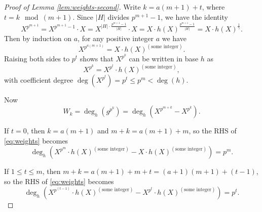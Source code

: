 \documentclass[10pt,a4paper]{amsart}
\begin{document}
\begin{proof}[Proof of Lemma \ref{lem:weights-second}] Write $k=a(m+1)+t$, where $t=k\mod (m+1).$ 
Since $|H|$ divides $p^{m+1}-1$, we have the identity
\[
X^{p^{m+1}} = X^{p^{m+1}-1}\cdot X = X^{|H|\cdot \frac{p^{m+1}-1}{|H|}}\cdot X
= X\cdot h(X)^{\frac{p^{m+1}-1}{|H|}}
= X\cdot h(X)^{\frac{1}{\gamma}}.
\]
Then by induction on $a$, for any positive integer $a$ we have
\[
X^{p^{a(m+1)}}=X\cdot h(X)^{(\text{some integer})}.
\]
Raising both sides to $p^t$ shows that $X^{p^k}$ can be written in base $h$ as
\[
X^{p^k}=X^{p^t}\cdot h(X)^{(\text{some integer})},
\]
with coefficient degree $\deg(X^{p^t})=p^t\leq p^m<\deg(h)$.

Now
\begin{equation}
\label{eq:weights}
W_k=\deg_h\left(g^{p^k}\right) = \deg_h\left(X^{p^{m+k}}-X^{p^k}\right).
\end{equation}

If $t=0$, then $k=a(m+1)$ and $m+k=a(m+1)+m$, so the RHS of \eqref{eq:weights} becomes
$$\deg_h\left(
X^{p^m}\cdot h(X)^{(\text{some integer})}-X\cdot h(X)^{(\text{some integer})}
\right)=p^m.$$



If $1\le t\le m$, then $m+k=a(m+1)+m+t=(a+1)(m+1)+(t-1)$,
so the RHS of \eqref{eq:weights} becomes
$$\deg_h\left(
X^{p^{(t-1)}}\cdot h(X)^{(\text{some integer})}-X^{p^t}\cdot h(X)^{(\text{some integer})}
\right)=p^t.$$
\end{proof}
\end{document}
